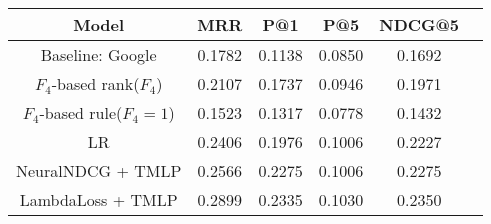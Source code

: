 \begin{table}[ht]
	\label{tab:reranking_end_to_end_performance}
	\begin{tabular}{c|ccccc}
		\textbf{Model}              & \textbf{MRR} & \textbf{P@1} & \textbf{P@5} & \textbf{NDCG@5} \\
		\toprule
		Baseline: Google            & 0.1782       & 0.1138       & 0.0850       & 0.1692          \\
		$F_4$-based rank($F_4$)     & 0.2107       & 0.1737       & 0.0946       & 0.1971          \\ %
		$F_4$-based rule($F_4 = 1$) & 0.1523       & 0.1317       & 0.0778       & 0.1432          \\ %
		LR                          & 0.2406       & 0.1976       & 0.1006       & 0.2227          \\ %
		NeuralNDCG + TMLP           & 0.2566       & 0.2275       & 0.1006       & 0.2275          \\ %
		LambdaLoss + TMLP           & 0.2899       & 0.2335       & 0.1030       & 0.2350          \\ %
	  \end{tabular}
	\end{table}